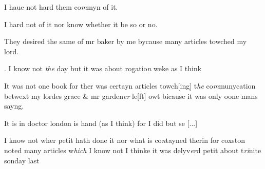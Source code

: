 \documentclass[12pt, a4paper]{book}
\begin{document}
         	
		\ifthenelse{\isodd{\thepage}}
		{\reversemarginpar}
		{\normalmarginpar}
		I haue not hard them co\textit{m}myn of it.
         	
				\marginpar[\vspace{0.5cm}{\textcolor{Gray}{25}}]{}
			
         	
		\ifthenelse{\isodd{\thepage}}
		{\reversemarginpar}
		{\normalmarginpar}
		I hard not of it nor know whether it be so or no.
         	
				\marginpar[\vspace{0.5cm}{\textcolor{Gray}{26}}]{}
			
         	
		\ifthenelse{\isodd{\thepage}}
		{\reversemarginpar}
		{\normalmarginpar}
		They desired the same of mr baker by me bycause many 
articles towched my lord.
         	
				\marginpar[\vspace{0.5cm}{\textcolor{Gray}{27}}]{}
			
         	
		\ifthenelse{\isodd{\thepage}}
		{\reversemarginpar}
		{\normalmarginpar}
		. I know not \textit{the} day but it was about rogatio\textit{n} weke as I think
         	
				\marginpar[\vspace{0.5cm}{\textcolor{Gray}{28.29.}}]{}
			
         	
		\ifthenelse{\isodd{\thepage}}
		{\reversemarginpar}
		{\normalmarginpar}
		It was not one book for ther was certayn articles towch[ing]
t\textit{he} co\textit{m}munycation betwext my lordes grace  \& mr garden\textit{er} le[ft]
owt bicause it was only oone mans sayng.
         	
				\marginpar[\vspace{0.5cm}{\textcolor{Gray}{30}}]{}
			
         	
		\ifthenelse{\isodd{\thepage}}
		{\reversemarginpar}
		{\normalmarginpar}
		 It is in doctor london is hand (as I think) for I did but se
				[...]
			
         	
				\marginpar[\vspace{0.5cm}{\textcolor{Gray}{31}}]{}
			
         	
		\ifthenelse{\isodd{\thepage}}
		{\reversemarginpar}
		{\normalmarginpar}
		I know not wher petit hath done it nor what is co\textit{n}tayned
therin for coxston noted many articles w\textit{hich} I know not 
I thinke it was delyv\textit{er}d petit about t\textit{ri}nite sonday last

\dotfill
						\newpage
{}
\end{document}
